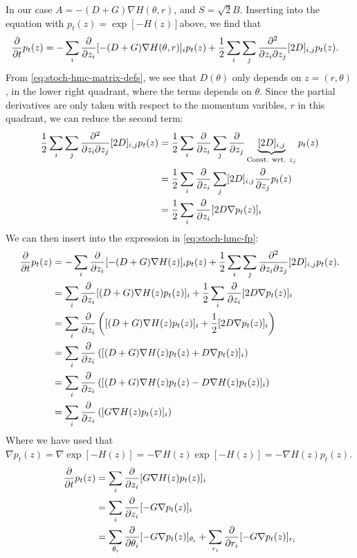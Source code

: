 In our case $A = -(D+G)\nabla H(\theta, r)$, and $S = \sqrt{2}B$.
Inserting into the equation with $p_t(z) = \exp[-H(z)]$above, we find that
\begin{align} \label{eq:stoch-hmc-fp}
    \pdv{t} p_t(z) &= - \sum_{i} \pdv{z_i} [ -(D+G)\nabla H(\theta, r)]_i p_t(z) 
    + \frac{1}{2}\sum_{i}\sum_{j}\pdv{}{z_i}{z_j}[2D]_{i,j}p_t(z). 
\end{align}
From \cref{eq:stoch-hmc-matrix-defs}, we see that $D(\theta)$ only depends on $z = (r, \theta)$, in the lower right quadrant, where the terms depends on $\theta$.
Since the partial derivatives are only taken with respect to the momentum varibles, $r$ in this quadrant, we can reduce the second term:
\begin{align*}
    \frac{1}{2}\sum_{i}\sum_{j}\pdv{}{z_i}{z_j}[2D]_{i,j}p_t(z)
    &= \frac{1}{2}\sum_{i}\pdv{z_i}\sum_{j}\pdv{z_j}\underbrace{[2D]_{i,j}}_{\text{Const. wrt. $z_j$}}p_t(z) \\
    &= \frac{1}{2}\sum_{i}\pdv{z_i}\sum_{j}[2D]_{i,j}\pdv{z_j}p_t(z)\\
    &= \frac{1}{2}\sum_{i}\pdv{z_i}[2D \nabla p_t(z)]_{i}
\end{align*}
We can then insert into the expression in \cref{eq:stoch-hmc-fp}:
\begin{align*} 
    \pdv{t} p_t(z) &= - \sum_{i} \pdv{z_i} [ -(D+G)\nabla H(z)]_i p_t(z) 
    + \frac{1}{2}\sum_{i}\sum_{j}\pdv{}{z_i}{z_j}[2D]_{i,j}p_t(z). \\
    &=  \sum_{i} \pdv{z_i} [ (D+G)\nabla H(z)p_t(z)]_i 
    + \frac{1}{2}\sum_{i}\pdv{z_i}[2D \nabla p_t(z)]_{i} \\
    &=  \sum_{i} \pdv{z_i} \left([ (D+G)\nabla H(z)p_t(z)]_i 
    + \frac{1}{2}[2D \nabla p_t(z)]_{i}\right) \\
    &=  \sum_{i} \pdv{z_i} \left([ (D+G)\nabla H(z)p_t(z) 
    + D \nabla p_t(z)]_{i}\right) \\
    &=  \sum_{i} \pdv{z_i} \left([ (D+G)\nabla H(z)p_t(z) 
    - D \nabla H(z) p_t(z)]_{i}\right) \\
    &=  \sum_{i} \pdv{z_i} \left([ G\nabla H(z)p_t(z)]_i \right) 
\end{align*}
Where we have used that $\nabla p_t(z) = \nabla \exp[-H(z)]= -\nabla H(z) \exp[-H(z)] =  -\nabla H(z) p_t(z)$. 
\begin{align}
    \pdv{t} p_t(z) &= \sum_{i} \pdv{z_i} [ G\nabla H(z)p_t(z)]_i \\
    &= \sum_{i} \pdv{z_i} [ -G\nabla p_t(z)]_i \\
    &= \sum_{\theta_i} \pdv{\theta_i} [ -G\nabla p_t(z)]_{\theta_i}
    + \sum_{r_i} \pdv{r_i} [ -G\nabla p_t(z)]_{r_i} \\
\end{align}
